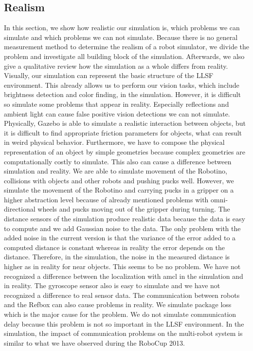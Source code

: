 \subsection{Realism}
In this section, we show how realistic our simulation is, which problems we can simulate and which problems we can not simulate. Because there is no general measurement method to determine the realism of a robot simulator, we divide the problem and investigate all building block of the simulation. Afterwards, we also give a qualitative review how the simulation as a whole differs from reality.\\
Visually, our simulation can represent the basic structure of the LLSF environment. This already allows us to perform our vision tasks, which include brightness detection and color finding, in the simulation. However, it is difficult so simulate some problems that appear in reality. Especially reflections and ambient light can cause false positive vision detections we can not simulate. Physically, Gazebo is able to simulate a realistic interaction between objects, but it is difficult to find appropriate friction parameters for objects, what can result in weird physical behavior. Furthermore, we have to compose the physical representation of an object by simple geometries because complex geometries are computationally costly to simulate. This also can cause a difference between simulation and reality. We are able to simulate movement of the Robotino, collisions with objects and other robots and pushing pucks well. However, we simulate the movement of the Robotino and carrying pucks in a gripper on a higher abstraction level because of already mentioned problems with omni-directional wheels and pucks moving out of the gripper during turning. The distance sensors of the simulation produce realistic data because the data is easy to compute and we add Gaussian noise to the data. The only problem with the added noise in the current version is that the variance of the error added to a computed distance is constant whereas in reality the error depends on the distance. Therefore, in the simulation, the noise in the measured distance is higher as in reality for near objects. This seems to be no problem. We have not recognized a difference between the localization with amcl in the simulation and in reality. The gyroscope sensor also is easy to simulate and we have not recognized a difference to real sensor data. The communication between robots and the Refbox can also cause problems in reality. We simulate package loss which is the major cause for the problem. We do not simulate communication delay because this problem is not so important in the LLSF environment. In the simulation, the impact of communication problems on the multi-robot system is similar to what we have observed during the RoboCup 2013.\\
